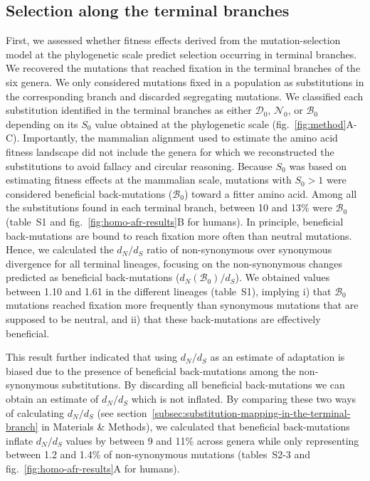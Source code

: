 \documentclass{article}
\newcommand{\dn}{d_N}
\newcommand{\ds}{d_S}
\newcommand{\dnds}{\dn / \ds}
\newcommand{\Sphy}{S_{0}}
\newcommand{\SphyDel}{\mathcal{D}_0}
\newcommand{\SphyNeu}{\mathcal{N}_0}
\newcommand{\SphyBen}{\mathcal{B}_0}
\begin{document}
 \subsection*{Selection along the terminal branches}
    First, we assessed whether fitness effects derived from the mutation-selection model at the phylogenetic scale predict selection occurring in terminal branches.
    We recovered the mutations that reached fixation in the terminal branches of the six genera.
    We only considered mutations fixed in a population as substitutions in the corresponding branch and discarded segregating mutations.
    We classified each substitution identified in the terminal branches as either $\SphyDel$, $\SphyNeu$, or $\SphyBen$ depending on its $\Sphy$ value obtained at the phylogenetic scale (fig.~\ref{fig:method}A-C).
    Importantly, the mammalian alignment used to estimate the amino acid fitness landscape did not include the genera for which we reconstructed the substitutions to avoid fallacy and circular reasoning.
    Because $\Sphy$ was based on estimating fitness effects at the mammalian scale, mutations with $\Sphy>1$ were considered beneficial back-mutations ($\SphyBen$) toward a fitter amino acid.
    Among all the substitutions found in each terminal branch, between 10 and 13\% were $\SphyBen$ (table~S1 and fig.~\ref{fig:homo-afr-results}B for humans).
    In principle, beneficial back-mutations are bound to reach fixation more often than neutral mutations.
    Hence, we calculated the $\dnds$ ratio of non-synonymous over synonymous divergence for all terminal lineages, focusing on the non-synonymous changes predicted as beneficial back-mutations ($\dn(\SphyBen) / \ds$).
    We obtained values between 1.10 and 1.61 in the different lineages (table~S1), implying i) that $\SphyBen$ mutations reached fixation more frequently than synonymous mutations that are supposed to be neutral, and ii) that these back-mutations are effectively beneficial.

    This result further indicated that using $\dnds$ as an estimate of adaptation is biased due to the presence of beneficial back-mutations among the non-synonymous substitutions.
    By discarding all beneficial back-mutations we can obtain an estimate of $\dnds$ which is not inflated.
    By comparing these two ways of calculating $\dnds$ (see section~\ref{subsec:substitution-mapping-in-the-terminal-branch} in Materials \& Methods), we calculated that beneficial back-mutations inflate $\dnds$ values by between 9 and 11\% across genera while only representing between 1.2 and 1.4\% of non-synonymous mutations (tables~S2-3 and fig.~\ref{fig:homo-afr-results}A for humans).
\end{document}
